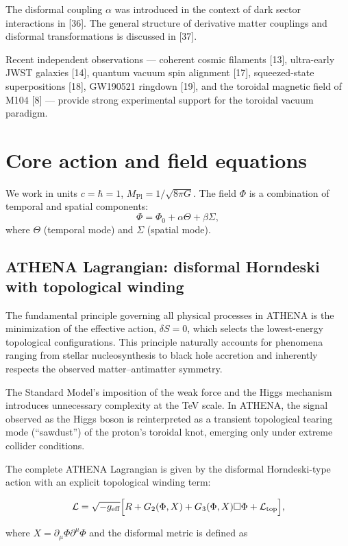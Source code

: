 \documentclass[11pt,a4paper]{article}
\begin{document}
The disformal coupling \(\alpha\) was introduced in the context of dark sector interactions in [36]. The general structure of derivative matter couplings and disformal transformations is discussed in [37].

Recent independent observations — coherent cosmic filaments [13], ultra-early JWST galaxies [14], quantum vacuum spin alignment [17], squeezed-state superpositions [18], GW190521 ringdown [19], and the toroidal magnetic field of M104 [8] — provide strong experimental support for the toroidal vacuum paradigm.

\section{Core action and field equations}
\label{sec:action}
We work in units \(c = \hbar = 1\), \(M_{\mathrm{Pl}} = 1/\sqrt{8\pi G}\). The field \(\Phi\) is a combination of temporal and spatial components:
\[
\Phi = \Phi_0 + \alpha \Theta + \beta \Sigma, \tag{1}
\]
where \(\Theta\) (temporal mode) and \(\Sigma\) (spatial mode). 

\subsection{ATHENA Lagrangian: disformal Horndeski with topological winding}
\label{subsec:lagrangian}

The fundamental principle governing all physical processes in ATHENA is the minimization of the effective action, \(\delta S = 0\), which selects the lowest-energy topological configurations. This principle naturally accounts for phenomena ranging from stellar nucleosynthesis to black hole accretion and inherently respects the observed matter--antimatter symmetry.

The Standard Model's imposition of the weak force and the Higgs mechanism introduces unnecessary complexity at the TeV scale. In ATHENA, the signal observed as the Higgs boson is reinterpreted as a transient topological tearing mode (``sawdust'') of the proton's toroidal knot, emerging only under extreme collider conditions.

The complete ATHENA Lagrangian is given by the disformal Horndeski-type action with an explicit topological winding term:

\[
\mathcal{L} = \sqrt{-g_{\rm eff}} \Big[ R + G_2(\Phi, X) + G_3(\Phi, X) \square\Phi + \mathcal{L}_{\rm top} \Big],
\]

where \( X = \partial_\mu \Phi \partial^\mu \Phi \) and the disformal metric is defined as
\end{document}
